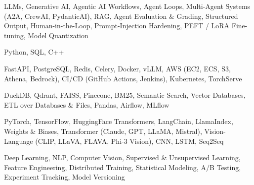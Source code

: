 \documentclass[letter,10pt]{article}
\begin{document}
 LLMs, Generative AI, Agentic AI Workflows, Agent Loops, Multi-Agent Systems (A2A, CrewAI, PydanticAI), RAG, Agent Evaluation \& Grading, Structured Output, Human-in-the-Loop, Prompt-Injection Hardening, PEFT / LoRA Fine-tuning, Model Quantization\par\vspace{2pt}

 Python, SQL, C++\par\vspace{2pt}

 FastAPI, PostgreSQL, Redis, Celery, Docker, vLLM, AWS (EC2, ECS, S3, Athena, Bedrock), CI/CD (GitHub Actions, Jenkins), Kubernetes, TorchServe\par\vspace{2pt}

 DuckDB, Qdrant, FAISS, Pinecone, BM25, Semantic Search, Vector Databases, ETL over Databases \& Files, Pandas, Airflow, MLflow\par\vspace{2pt}

 PyTorch, TensorFlow, HuggingFace Transformers, LangChain, LlamaIndex, Weights \& Biases, Transformer (Claude, GPT, LLaMA, Mistral), Vision-Language (CLIP, LLaVA, FLAVA, Phi-3 Vision), CNN, LSTM, Seq2Seq\par\vspace{2pt}

 Deep Learning, NLP, Computer Vision, Supervised \& Unsupervised Learning, Feature Engineering, Distributed Training, Statistical Modeling, A/B Testing, Experiment Tracking, Model Versioning
\end{document}
